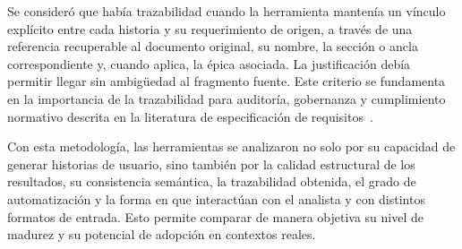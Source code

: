 Se consideró que había trazabilidad cuando la herramienta mantenía un vínculo explícito entre cada historia y su requerimiento de origen, a través de una referencia recuperable al documento original, su nombre, la sección o ancla correspondiente y, cuando aplica, la épica asociada. La justificación debía permitir llegar sin ambigüedad al fragmento fuente. Este criterio se fundamenta en la importancia de la trazabilidad para auditoría, gobernanza y cumplimiento normativo descrita en la literatura de especificación de requisitos~\cite{ieee830}.

Con esta metodología, las herramientas se analizaron no solo por su capacidad de generar historias de usuario, sino también por la calidad estructural de los resultados, su consistencia semántica, la trazabilidad obtenida, el grado de automatización y la forma en que interactúan con el analista y con distintos formatos de entrada. Esto permite comparar de manera objetiva su nivel de madurez y su potencial de adopción en contextos reales.

